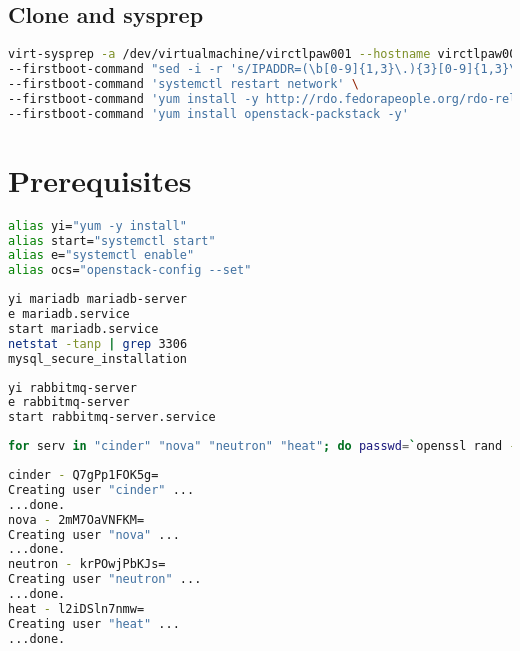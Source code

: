 \documentclass[11pt,letterpaper,oneside]{book}
\begin{document}
\section{Clone and sysprep}
\begin{lstlisting}[caption={Sysprep example},language=bash]
virt-sysprep -a /dev/virtualmachine/virctlpaw001 --hostname virctlpaw001.virtomation.com \
--firstboot-command "sed -i -r 's/IPADDR=(\b[0-9]{1,3}\.){3}[0-9]{1,3}\b'/IPADDR=10.53.252.61/ /etc/sysconfig/network-scripts/ifcfg-eth0" \
--firstboot-command 'systemctl restart network' \
--firstboot-command 'yum install -y http://rdo.fedorapeople.org/rdo-release.rpm' \
--firstboot-command 'yum install openstack-packstack -y' 
\end{lstlisting}

\chapter{Prerequisites}

\begin{lstlisting}[caption={Bash Aliases},language=bash]
alias yi="yum -y install"
alias start="systemctl start"
alias e="systemctl enable"
alias ocs="openstack-config --set"
\end{lstlisting}

\begin{lstlisting}[caption={Database Install},language=bash]
yi mariadb mariadb-server
e mariadb.service 
start mariadb.service 
netstat -tanp | grep 3306
mysql_secure_installation 
\end{lstlisting}

\begin{lstlisting}[caption={RabbitMQ Install},language=bash]
yi rabbitmq-server
e rabbitmq-server
start rabbitmq-server.service
\end{lstlisting}

\begin{lstlisting}[caption={Create RabbitMQ User Accounts},language=bash]
for serv in "cinder" "nova" "neutron" "heat"; do passwd=`openssl rand -base64 8`; echo "$serv - $passwd"; rabbitmqctl add_user $serv $passwd; rabbitmqctl set_permissions -p / $serv ".*" ".*" ".*"; done
\end{lstlisting}


\begin{lstlisting}[caption={Result from user account creation},language=bash]
cinder - Q7gPp1FOK5g=
Creating user "cinder" ...
...done.
nova - 2mM7OaVNFKM=
Creating user "nova" ...
...done.
neutron - krPOwjPbKJs=
Creating user "neutron" ...
...done.
heat - l2iDSln7nmw=
Creating user "heat" ...
...done.
\end{lstlisting}
\end{document}
